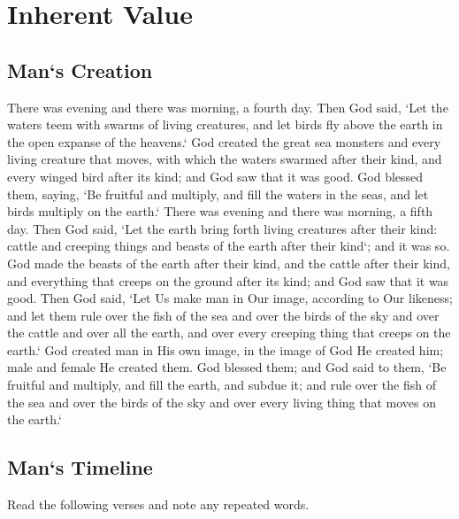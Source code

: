 \chapter{Inherent Value}

\section{Man`s Creation}
\begin{scripture}[Gen 1:19--28]
        \vs[19]There was evening and there was morning, a fourth day.
        Then God said, `Let the waters teem with swarms of living creatures, and let birds fly above the earth in the open expanse of the heavens.`
        God created the great sea monsters and every living creature that moves, with which the waters swarmed after their kind, and every winged bird after its kind; and God saw that it was good.
        God blessed them, saying, `Be fruitful and multiply, and fill the waters in the seas, and let birds multiply on the earth.`
        There was evening and there was morning, a fifth day.
        Then God said, `Let the earth bring forth living creatures after their kind: cattle and creeping things and beasts of the earth after their kind`; and it was so.
        God made the beasts of the earth after their kind, and the cattle after their kind, and everything that creeps on the ground after its kind; and God saw that it was good.
        Then God said, `Let Us make man in Our image, according to Our likeness; and let them rule over the fish of the sea and over the birds of the sky and over the cattle and over all the earth, and over every creeping thing that creeps on the earth.`
        God created man in His own image, in the image of God He created him; male and female He created them.
        God blessed them; and God said to them, `Be fruitful and multiply, and fill the earth, and subdue it; and rule over the fish of the sea and over the birds of the sky and over every living thing that moves on the earth.`
\end{scripture}



\newpage
\section{Man`s Timeline}
Read the following verses and note any repeated words. 
\vspace{2\baselineskip}

